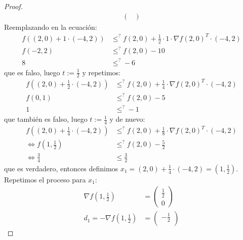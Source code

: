\documentclass{article}
\begin{document}
\begin{proof}
\begin{align*}
\begin{pmatrix}
                                              \end{pmatrix}
    \end{align*}
    Reemplazando en la ecuación: \begin{align*}
        f((2,0) + 1 \cdot (-4, 2)) & \leq^{?} f(2, 0) + \frac{1}{2} \cdot 1 \cdot {\nabla f(2,0)}^T \cdot (-4, 2) \\
        f(-2, 2)                   & \leq^{?} f(2, 0) - 10                                                        \\
        8                          & \leq^{?} -6
    \end{align*}
    que es falso, luego \( t := \frac{1}{2} \) y repetimos: \begin{align*}
        f((2, 0) + \frac{1}{2} \cdot (-4, 2)) & \leq^{?} f(2, 0) + \frac{1}{4} \cdot {\nabla f(2,0)}^T \cdot (-4, 2) \\
        f(0, 1)                               & \leq^{?} f(2, 0) - 5                                                 \\
        1                                     & \leq^{?} -1
    \end{align*}
    que también es falso, luego \( t := \frac{1}{4} \) y de nuevo: \begin{align*}
        f((2, 0) + \frac{1}{4} \cdot (-4, 2)) & \leq^{?} f(2, 0) + \frac{1}{8} \cdot {\nabla f(2,0)}^T \cdot (-4, 2) \\
        \iff f(1, \frac{1}{2})                & \leq^{?} f(2, 0) - \frac{5}{2}                                       \\
        \iff \frac{3}{4}                      & \leq \frac{3}{2}
    \end{align*}
    que es verdadero, entonces definimos \( x_1 = (2, 0) + \frac{1}{4} \cdot (-4, 2) = (1, \frac{1}{2}) \). \\
    Repetimos el proceso para \( x_1 \): \begin{align*}
        \nabla f(1, \frac{1}{2})                   & = \begin{pmatrix}
                                                           \frac{1}{2} \\
                                                           0
                                                       \end{pmatrix} \\
        d_1           = - \nabla f(1, \frac{1}{2}) & = \begin{pmatrix}
                                                           -\frac{1}{2} \\

\end{pmatrix}
\end{align*}
\end{proof}
\end{document}
